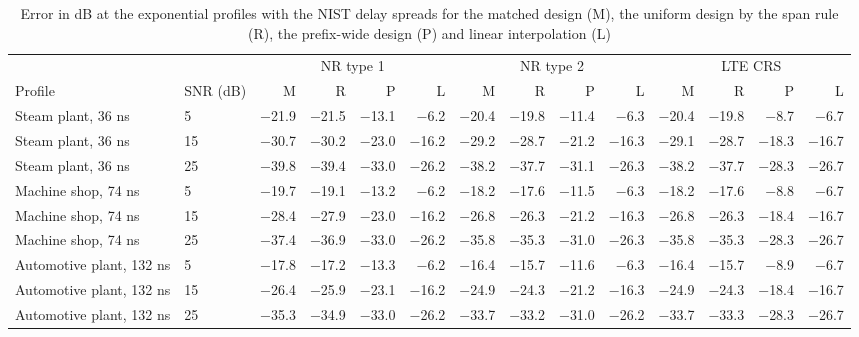 \begin{table}[t]
\caption{Error in dB at the exponential profiles with the NIST delay spreads for the matched design (M), the uniform design by the span rule (R), the prefix-wide design (P) and linear interpolation (L)}
\label{tab:sites}
\centering
\footnotesize
\setlength{\tabcolsep}{3pt}
\begin{tabular}{ll rrrr rrrr rrrr}
\toprule
 & & \multicolumn{4}{c}{NR type 1} & \multicolumn{4}{c}{NR type 2} & \multicolumn{4}{c}{LTE CRS} \\
\cmidrule(lr){3-6}\cmidrule(lr){7-10}\cmidrule(lr){11-14}
Profile & SNR (dB) & M & R & P & L & M & R & P & L & M & R & P & L \\
\midrule
Steam plant, 36 ns & 5 & $-$21.9 & $-$21.5 & $-$13.1 & $-$6.2 & $-$20.4 & $-$19.8 & $-$11.4 & $-$6.3 & $-$20.4 & $-$19.8 & $-$8.7 & $-$6.7 \\
Steam plant, 36 ns & 15 & $-$30.7 & $-$30.2 & $-$23.0 & $-$16.2 & $-$29.2 & $-$28.7 & $-$21.2 & $-$16.3 & $-$29.1 & $-$28.7 & $-$18.3 & $-$16.7 \\
Steam plant, 36 ns & 25 & $-$39.8 & $-$39.4 & $-$33.0 & $-$26.2 & $-$38.2 & $-$37.7 & $-$31.1 & $-$26.3 & $-$38.2 & $-$37.7 & $-$28.3 & $-$26.7 \\
Machine shop, 74 ns & 5 & $-$19.7 & $-$19.1 & $-$13.2 & $-$6.2 & $-$18.2 & $-$17.6 & $-$11.5 & $-$6.3 & $-$18.2 & $-$17.6 & $-$8.8 & $-$6.7 \\
Machine shop, 74 ns & 15 & $-$28.4 & $-$27.9 & $-$23.0 & $-$16.2 & $-$26.8 & $-$26.3 & $-$21.2 & $-$16.3 & $-$26.8 & $-$26.3 & $-$18.4 & $-$16.7 \\
Machine shop, 74 ns & 25 & $-$37.4 & $-$36.9 & $-$33.0 & $-$26.2 & $-$35.8 & $-$35.3 & $-$31.0 & $-$26.3 & $-$35.8 & $-$35.3 & $-$28.3 & $-$26.7 \\
Automotive plant, 132 ns & 5 & $-$17.8 & $-$17.2 & $-$13.3 & $-$6.2 & $-$16.4 & $-$15.7 & $-$11.6 & $-$6.3 & $-$16.4 & $-$15.7 & $-$8.9 & $-$6.7 \\
Automotive plant, 132 ns & 15 & $-$26.4 & $-$25.9 & $-$23.1 & $-$16.2 & $-$24.9 & $-$24.3 & $-$21.2 & $-$16.3 & $-$24.9 & $-$24.3 & $-$18.4 & $-$16.7 \\
Automotive plant, 132 ns & 25 & $-$35.3 & $-$34.9 & $-$33.0 & $-$26.2 & $-$33.7 & $-$33.2 & $-$31.0 & $-$26.2 & $-$33.7 & $-$33.3 & $-$28.3 & $-$26.7 \\
\bottomrule
\end{tabular}
\end{table}
